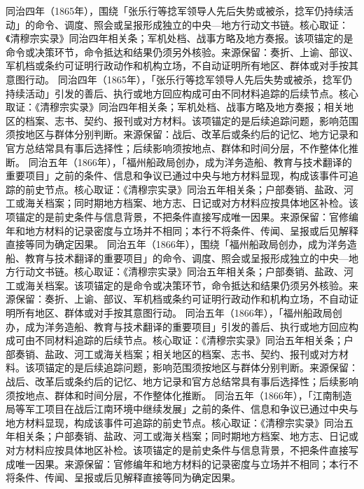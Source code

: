 同治四年（1865年），围绕「张乐行等捻军领导人先后失势或被杀，捻军仍持续活动」的命令、调度、照会或呈报形成独立的中央—地方行动文书链。核心取证：《清穆宗实录》同治四年相关条；军机处档、战事方略及地方奏报。该项锚定的是命令或决策环节，命令抵达和结果仍须另外核验。来源保留：奏折、上谕、部议、军机档或条约可证明行政动作和机构立场，不自动证明所有地区、群体或对手按其意图行动。
同治四年（1865年），「张乐行等捻军领导人先后失势或被杀，捻军仍持续活动」引发的善后、执行或地方回应构成可由不同材料追踪的后续节点。核心取证：《清穆宗实录》同治四年相关条；军机处档、战事方略及地方奏报；相关地区的档案、志书、契约、报刊或对方材料。该项锚定的是后续追踪问题，影响范围须按地区与群体分别判断。来源保留：战后、改革后或条约后的记忆、地方记录和官方总结常具有事后选择性；后续影响须按地点、群体和时间分层，不作整体化推断。
同治五年（1866年），「福州船政局创办，成为洋务造船、教育与技术翻译的重要项目」之前的条件、信息和争议已通过中央与地方材料显现，构成该事件可追踪的前史节点。核心取证：《清穆宗实录》同治五年相关条；户部奏销、盐政、河工或海关档案；同时期地方档案、地方志、日记或对方材料应按具体地区补检。该项锚定的是前史条件与信息背景，不把条件直接写成唯一因果。来源保留：官修编年和地方材料的记录密度与立场并不相同；本行不将条件、传闻、呈报或后见解释直接等同为确定因果。
同治五年（1866年），围绕「福州船政局创办，成为洋务造船、教育与技术翻译的重要项目」的命令、调度、照会或呈报形成独立的中央—地方行动文书链。核心取证：《清穆宗实录》同治五年相关条；户部奏销、盐政、河工或海关档案。该项锚定的是命令或决策环节，命令抵达和结果仍须另外核验。来源保留：奏折、上谕、部议、军机档或条约可证明行政动作和机构立场，不自动证明所有地区、群体或对手按其意图行动。
同治五年（1866年），「福州船政局创办，成为洋务造船、教育与技术翻译的重要项目」引发的善后、执行或地方回应构成可由不同材料追踪的后续节点。核心取证：《清穆宗实录》同治五年相关条；户部奏销、盐政、河工或海关档案；相关地区的档案、志书、契约、报刊或对方材料。该项锚定的是后续追踪问题，影响范围须按地区与群体分别判断。来源保留：战后、改革后或条约后的记忆、地方记录和官方总结常具有事后选择性；后续影响须按地点、群体和时间分层，不作整体化推断。
同治五年（1866年），「江南制造局等军工项目在战后江南环境中继续发展」之前的条件、信息和争议已通过中央与地方材料显现，构成该事件可追踪的前史节点。核心取证：《清穆宗实录》同治五年相关条；户部奏销、盐政、河工或海关档案；同时期地方档案、地方志、日记或对方材料应按具体地区补检。该项锚定的是前史条件与信息背景，不把条件直接写成唯一因果。来源保留：官修编年和地方材料的记录密度与立场并不相同；本行不将条件、传闻、呈报或后见解释直接等同为确定因果。
